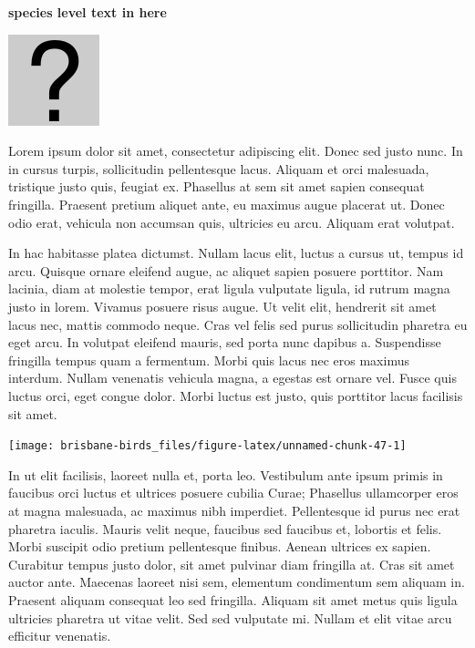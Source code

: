 \documentclass[]{book}
\let\origfigure\figure
\let\endorigfigure\endfigure
\renewenvironment{figure}[1][2] {
  \expandafter\origfigure\expandafter[H]
} {
  \endorigfigure
}
\begin{document}
\textbf{species level text in here}

\begin{figure}
\centering
\includegraphics{assets/missing.png}
\caption{No image for species}
\end{figure}

Lorem ipsum dolor sit amet, consectetur adipiscing elit. Donec sed justo
nunc. In in cursus turpis, sollicitudin pellentesque lacus. Aliquam et
orci malesuada, tristique justo quis, feugiat ex. Phasellus at sem sit
amet sapien consequat fringilla. Praesent pretium aliquet ante, eu
maximus augue placerat ut. Donec odio erat, vehicula non accumsan quis,
ultricies eu arcu. Aliquam erat volutpat.

In hac habitasse platea dictumst. Nullam lacus elit, luctus a cursus ut,
tempus id arcu. Quisque ornare eleifend augue, ac aliquet sapien posuere
porttitor. Nam lacinia, diam at molestie tempor, erat ligula vulputate
ligula, id rutrum magna justo in lorem. Vivamus posuere risus augue. Ut
velit elit, hendrerit sit amet lacus nec, mattis commodo neque. Cras vel
felis sed purus sollicitudin pharetra eu eget arcu. In volutpat eleifend
mauris, sed porta nunc dapibus a. Suspendisse fringilla tempus quam a
fermentum. Morbi quis lacus nec eros maximus interdum. Nullam venenatis
vehicula magna, a egestas est ornare vel. Fusce quis luctus orci, eget
congue dolor. Morbi luctus est justo, quis porttitor lacus facilisis sit
amet.

\begin{figure}
\texttt{[image: brisbane-birds\_files/figure-latex/unnamed-chunk-47-1]} \caption{insert figure caption}\label{fig:unnamed-chunk-47}
\end{figure}

In ut elit facilisis, laoreet nulla et, porta leo. Vestibulum ante ipsum
primis in faucibus orci luctus et ultrices posuere cubilia Curae;
Phasellus ullamcorper eros at magna malesuada, ac maximus nibh
imperdiet. Pellentesque id purus nec erat pharetra iaculis. Mauris velit
neque, faucibus sed faucibus et, lobortis et felis. Morbi suscipit odio
pretium pellentesque finibus. Aenean ultrices ex sapien. Curabitur
tempus justo dolor, sit amet pulvinar diam fringilla at. Cras sit amet
auctor ante. Maecenas laoreet nisi sem, elementum condimentum sem
aliquam in. Praesent aliquam consequat leo sed fringilla. Aliquam sit
amet metus quis ligula ultricies pharetra ut vitae velit. Sed sed
vulputate mi. Nullam et elit vitae arcu efficitur venenatis.
\end{document}
